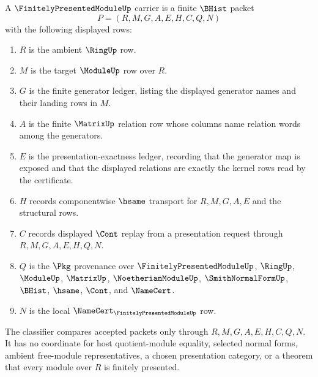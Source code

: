 \begin{definition}
\label{def:finitely-presented-module-carrier}
A $\FinitelyPresentedModuleUp$ carrier is a finite $\BHist$ packet
$$
P=(R,M,G,A,E,H,C,Q,N)
$$
with the following displayed rows:
\begin{enumerate}
\item $R$ is the ambient $\RingUp$ row.
\item $M$ is the target $\ModuleUp$ row over $R$.
\item $G$ is the finite generator ledger, listing the displayed generator names and their landing rows in $M$.
\item $A$ is the finite $\MatrixUp$ relation row whose columns name relation words among the generators.
\item $E$ is the presentation-exactness ledger, recording that the generator map is exposed and that the displayed relations are exactly the kernel rows read by the certificate.
\item $H$ records componentwise $\hsame$ transport for $R,M,G,A,E$ and the structural rows.
\item $C$ records displayed $\Cont$ replay from a presentation request through $R,M,G,A,E,H,Q,N$.
\item $Q$ is the $\Pkg$ provenance over $\FinitelyPresentedModuleUp$, $\RingUp$, $\ModuleUp$, $\MatrixUp$, $\NoetherianModuleUp$, $\SmithNormalFormUp$, $\BHist$, $\hsame$, $\Cont$, and $\NameCert$.
\item $N$ is the local $\NameCert_{\FinitelyPresentedModuleUp}$ row.
\end{enumerate}
The classifier compares accepted packets only through $R,M,G,A,E,H,C,Q,N$. It has no coordinate for host quotient-module equality, selected normal forms, ambient free-module representatives, a chosen presentation category, or a theorem that every module over $R$ is finitely presented.
\end{definition}

